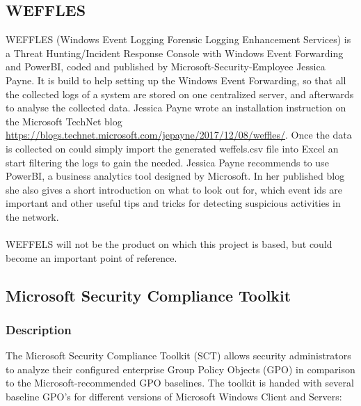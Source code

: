 \subsection{WEFFLES}
WEFFLES (Windows Event Logging Forensic Logging Enhancement Services) is a Threat Hunting/Incident Response Console with Windows Event Forwarding and PowerBI, coded and published by Microsoft-Security-Employee Jessica Payne. It is build to help setting up the Windows Event Forwarding, so that all the collected logs of a system are stored on one centralized server, and afterwards to analyse the collected data. Jessica Payne wrote an installation instruction on the Microsoft TechNet blog \url{https://blogs.technet.microsoft.com/jepayne/2017/12/08/weffles/}. Once the data is collected on could simply import the generated weffels.csv file into Excel an start filtering the logs to gain the needed. Jessica Payne recommends to use PowerBI, a business analytics tool designed by Microsoft. In her published blog she also gives a short introduction on what to look out for, which event ids are important and other useful tips and tricks for detecting suspicious activities in the network.\ \\
\ \\
WEFFELS will not be the product on which this project is based, but could become an important point of reference. 

\subsection{Microsoft Security Compliance Toolkit}
\subsubsection{Description}
The Microsoft Security Compliance Toolkit (SCT) \cite{SCT} allows security administrators to analyze their configured enterprise Group Policy Objects (GPO) in comparison to the Microsoft-recommended GPO baselines. The toolkit is handed with several baseline GPO's for different versions of Microsoft Windows Client and Servers:

